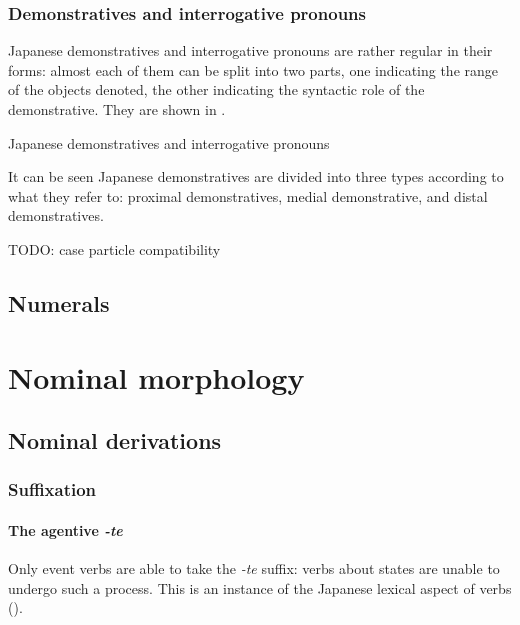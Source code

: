 \documentclass[UTF8, a4paper, oneside, scheme=plain]{ctexrep}
\newcommand{\corpus}[1]{\emph{#1}}
\begin{document}
\subsection{Demonstratives and interrogative pronouns}

Japanese demonstratives and interrogative pronouns are rather regular in their forms:
almost each of them can be split into two parts,
one indicating the range of the objects denoted,
the other indicating the syntactic role of the demonstrative.
They are shown in .

\begin{table}[H]
    \centering
    \caption{Japanese demonstratives and interrogative pronouns}
    \label{tbl:demonstrative}
     
\end{table}

It can be seen Japanese demonstratives are divided into three types according to what they refer to: 
proximal demonstratives, medial demonstrative, and distal demonstratives.

TODO: case particle compatibility

\section{Numerals}

\chapter{Nominal morphology}

\section{Nominal derivations}

\subsection{Suffixation}

\subsubsection{The agentive \corpus{-te}}\label{sec:agentive-te}

Only event verbs are able to take the \corpus{-te} suffix:
verbs about states are unable to undergo such a process.
This is an instance of the Japanese lexical aspect of verbs ().
\end{document}
